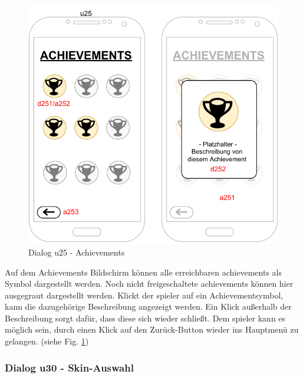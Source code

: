 \begin{figure}[h!]
    \begin{center}
        \includegraphics[scale=1.4]{diagramme/pdf/Mockup-u25.pdf}
    \end{center}
    \caption{Dialog u25 - Achievements}\label{fig:dia:u25}
\end{figure}

Auf dem Achievements Bildschirm können alle erreichbaren \gls{achievements} als Symbol dargestellt werden. Noch nicht freigeschaltete \gls{achievements} können hier ausgegraut dargestellt werden. Klickt der \gls{spieler} auf ein Achievementsymbol, kann die dazugehörige Beschreibung angezeigt werden. Ein Klick außerhalb der Beschreibung sorgt dafür, dass diese sich wieder schließt.
Dem \gls{spieler} kann es möglich sein, durch einen Klick auf den Zurück-Button wieder ins Hauptmenü zu gelangen.
(siehe Fig. \ref{fig:dia:u25})
\clearpage

\subsubsection{Dialog u30 - Skin-Auswahl}\label{dialog:skins}

